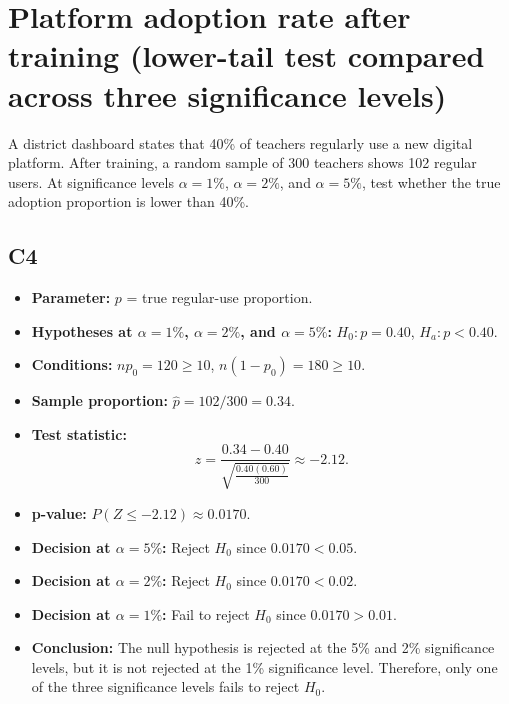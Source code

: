 
\section{Platform adoption rate after training (lower-tail test compared across three significance levels)}
A district dashboard states that 40\% of teachers regularly use a new digital platform. After training, a random sample of 300 teachers shows 102 regular users. At significance levels \(\alpha=1\%\), \(\alpha=2\%\), and \(\alpha=5\%\), test whether the true adoption proportion is lower than 40\%.

\subsection*{C4}
\begin{itemize}
	\item \textbf{Parameter:} \(p\) = true regular-use proportion.
	\item \textbf{Hypotheses at \(\alpha=1\%\), \(\alpha=2\%\), and \(\alpha=5\%\):} \(H_0\colon p=0.40\), \(H_a\colon p<0.40\).
	\item \textbf{Conditions:} \(np_0=120\ge10\), \(n(1-p_0)=180\ge10\).
	\item \textbf{Sample proportion:} \(\hat p=102/300=0.34\).
	\item \textbf{Test statistic:}
	\[
	z=\frac{0.34-0.40}{\sqrt{\frac{0.40(0.60)}{300}}}\approx -2.12.
	\]
	\item \textbf{p-value:} \(P(Z\le -2.12)\approx 0.0170\).
	\item \textbf{Decision at \(\alpha=5\%\):} Reject \(H_0\) since \(0.0170<0.05\).
	\item \textbf{Decision at \(\alpha=2\%\):} Reject \(H_0\) since \(0.0170<0.02\).
	\item \textbf{Decision at \(\alpha=1\%\):} Fail to reject \(H_0\) since \(0.0170>0.01\).
	\item \textbf{Conclusion:} The null hypothesis is rejected at the 5\% and 2\% significance levels, but it is not rejected at the 1\% significance level. Therefore, only one of the three significance levels fails to reject \(H_0\).
\end{itemize}

\begin{center}
\end{center}

